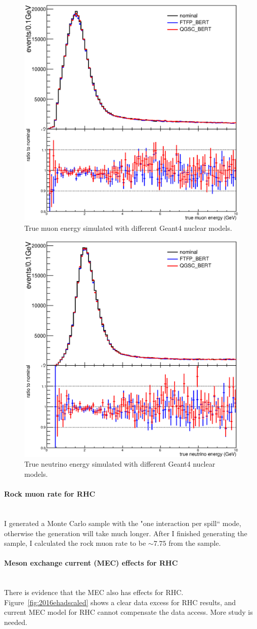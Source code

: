\documentclass[12pt,a4paper,final]{iopart}
\begin{document}
\begin{figure}
  \centering
  \includegraphics[width=.5\textwidth]{figures/2016/nuclear_model_mu.eps}
  \caption{True muon energy simulated with different Geant4 nuclear models.}
  \label{fig:2016truemu}
\end{figure}
\begin{figure}
  \centering
  \includegraphics[width=.5\textwidth]{figures/2016/nuclear_model_nu.eps}
  \caption{True neutrino energy simulated with different Geant4 nuclear models.}
  \label{fig:2016truenu}
\end{figure}

\paragraph{\textbf{Rock muon rate for RHC}}\hspace*{\fill}\\
I generated a Monte Carlo sample with the "one interaction per spill`` mode, otherwise the generation will take much longer. After I finished generating the sample, I calculated the rock muon rate to be $\sim 7.75$ from the sample.

\paragraph{\textbf{Meson exchange current (MEC) effects for RHC}}\hspace*{\fill}\\
There is evidence that the MEC also has effects for RHC. Figure~\ref{fig:2016ehadscaled} shows a clear data excess for RHC results, and current MEC model for RHC cannot compensate the data access. More study is needed.
\end{document}
